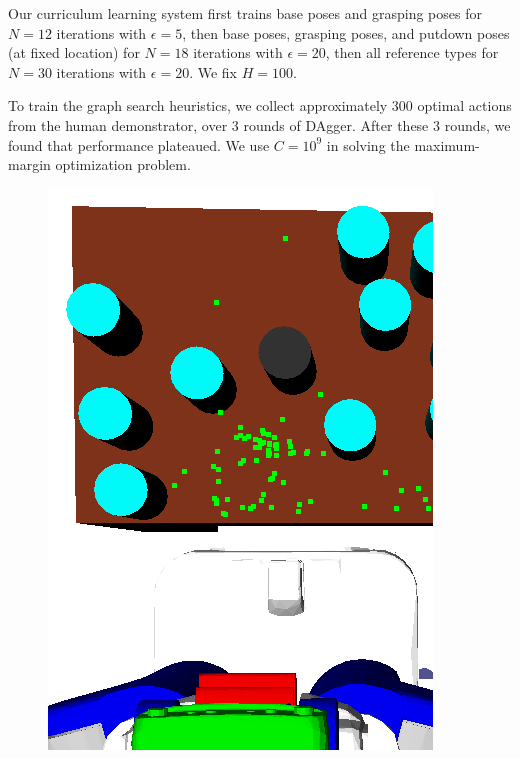 Our curriculum learning system first trains base poses and grasping poses for $N = 12$ iterations with $\epsilon = 5$,
then base poses, grasping poses, and putdown poses (at fixed location) for $N = 18$ iterations with $\epsilon = 20$,
then all reference types for $N = 30$ iterations with $\epsilon = 20$. We fix $H = 100$.

To train the graph search heuristics,
we collect approximately 300 optimal actions from the human demonstrator, over 3 rounds of {\sc DAgger}. After these 3 rounds,
we found that performance plateaued. We use $C = 10^{9}$ in solving the maximum-margin optimization problem.

\begin{figure}[t]
  \centering
    \noindent
    \includegraphics[scale=0.2]{images/grasp_context_1.png}

\end{figure}
